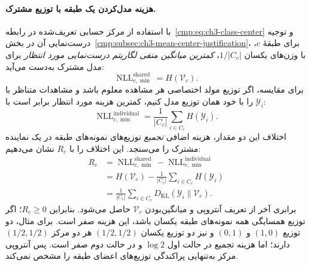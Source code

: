 \paragraph{هزینه مدل‌کردن یک طبقه با توزیع مشترک.}
با استفاده از مرکز حسابی تعریف‌شده در رابطه~\eqref{cmp:eq:ch3-class-center} و توجیه درست‌نمایی آن در بخش~\ref{cmp:subsec:ch3-mean-center-justification}، برای طبقهٔ $c$، با وزن‌های یکسان $1/|C_c|$، \emph{کمترین میانگین منفی لگاریتم درست‌نمایی مورد انتظار} برای مدل مشترک به‌دست می‌آید:
\begin{equation}\label{cmp:eq:ch3-class-shared-NLL}
\boxed{\operatorname{NLL}^{\mathrm{shared}}_{c,\min}
=H(\mathcal V_c).}
\end{equation}
برای مقایسه، اگر توزیع مولد اختصاصی هر مشاهده معلوم باشد و مشاهدات متناظر با $\mathscr Y_i$ را با خود همان توزیع مدل کنیم، کمترین هزینه مورد انتظار برابر است با:
\begin{equation}\label{cmp:eq:ch3-class-individual-NLL}
\boxed{\operatorname{NLL}^{\mathrm{individual}}_{c,\min}
=\frac{1}{|C_c|}\sum_{i\in C_c}H(\mathscr Y_i).}
\end{equation}
اختلاف این دو مقدار، هزینه اضافی \emph{تجمیع} توزیع‌های نمونه‌های طبقه در یک نماینده مشترک را می‌سنجد. این اختلاف را با $R_c$ نشان می‌دهیم:
\begin{equation}
\boxed{
\begin{aligned}
R_c
&=\operatorname{NLL}^{\mathrm{shared}}_{c,\min}
-\operatorname{NLL}^{\mathrm{individual}}_{c,\min}\\
&=H(\mathcal V_c)
-\frac1{|C_c|}\sum_{i\in C_c}H(\mathscr Y_i)\\
&=\frac1{|C_c|}\sum_{i\in C_c}
D_{\mathrm{KL}}(\mathscr Y_i\|\mathcal V_c).
\end{aligned}}
\end{equation}
برابری آخر از تعریف آنتروپی و میانگین‌بودن $\mathcal V_c$ حاصل می‌شود. بنابراین $R_c\ge0$؛ اگر توزیع همسایگی همه نمونه‌های طبقه یکسان باشد، این هزینه صفر است. برای مثال، دو توزیع $(1,0)$ و $(0,1)$ و نیز دو توزیع یکسان $(1/2,1/2)$ هر دو مرکز $(1/2,1/2)$ دارند؛ اما هزینه تجمیع در حالت اول $\log2$ و در حالت دوم صفر است. پس آنتروپی مرکز به‌تنهایی پراکندگی توزیع‌های اعضای طبقه را مشخص نمی‌کند.

